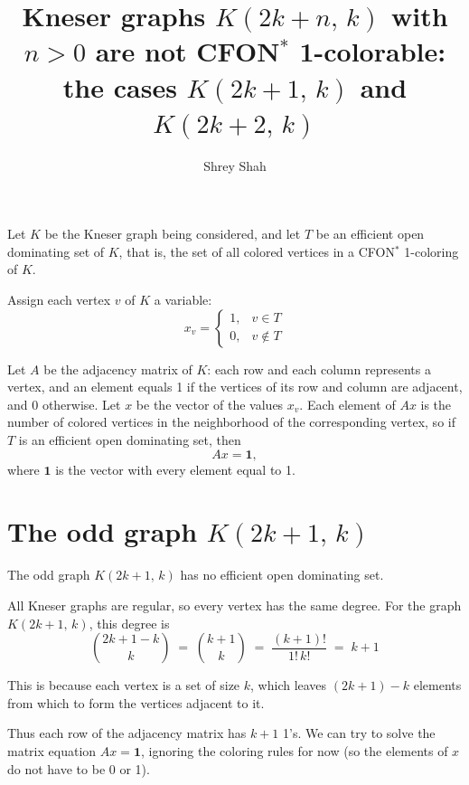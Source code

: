 \documentclass[11pt]{article}
\title{Kneser graphs $K(2k+n,\,k)$ with $n>0$ are not CFON$^{*}$ 1-colorable:\\[2pt]
       the cases $K(2k+1,\,k)$ and $K(2k+2,\,k)$}
\author{Shrey Shah}
\date{}
\begin{document}
\maketitle

Let $K$ be the Kneser graph being considered, and let $T$ be an efficient open
dominating set of $K$, that is, the set of all colored vertices in a
CFON$^{*}$ 1-coloring of $K$.

Assign each vertex $v$ of $K$ a variable:
\[
  x_v =
  \begin{cases}
    1, & v \in T\\
    0, & v \notin T
  \end{cases}
\]

Let $A$ be the adjacency matrix of $K$: each row and each column represents a
vertex, and an element equals 1 if the vertices of its row and column are
adjacent, and 0 otherwise. Let $x$ be the vector of the values $x_v$. Each
element of $Ax$ is the number of colored vertices in the neighborhood of the
corresponding vertex, so if $T$ is an efficient open dominating set, then
\[
  Ax = \mathbf{1},
\]
where $\mathbf{1}$ is the vector with every element equal to 1.

\section{The odd graph $K(2k+1,\,k)$}

The odd graph $K(2k+1,\,k)$ has no efficient open dominating set.

All Kneser graphs are regular, so every vertex has the same degree. For the
graph $K(2k+1,\,k)$, this degree is
\[
  \binom{2k+1-k}{k} \;=\; \binom{k+1}{k} \;=\; \frac{(k+1)!}{1!\,k!} \;=\; k+1
\]

This is because each vertex is a set of size $k$, which leaves $(2k+1)-k$
elements from which to form the vertices adjacent to it.

Thus each row of the adjacency matrix has $k+1$ 1's. We can try to solve the
matrix equation $Ax = \mathbf{1}$, ignoring the coloring rules for now (so the
elements of $x$ do not have to be 0 or 1).
\end{document}

